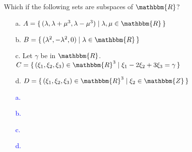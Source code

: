 \documentclass[a4paper,12pt]{article}
\newcommand{\Br}[1]{\{\, #1 \,\}}
\newcommand{\R}{\mathbbm{R}}
\newcommand{\Z}{\mathbbm{Z}}
\begin{document}
\subsection{}
Which if the following sets are subspaces of $\R$?
\begin{itemize}
 \item [a.] $A = \Br{(\lambda,\lambda+\mu^3,\lambda-\mu^3) \mid \lambda, \mu \in \R}$
 \item [b.] $B = \Br{(\lambda^2, -\lambda^2,0) \mid \lambda \in \R}$
 \item [c.] Let $\gamma$ be in $\R$. \\ $C = \Br{(\xi_1,\xi_2, \xi_3) \in \R^3 \mid \xi_1-2\xi_2+3\xi_3 = \gamma}$
 \item [d.] $D = \Br{(\xi_1,\xi_2, \xi_3) \in \R^3 \mid \xi_2 \in \Z}$
\end{itemize}
\textcolor{blue}{
\begin{itemize}
 \item [a.]
 \item [b.]
 \item [c.]
 \item [d.]
\end{itemize}
}
\end{document}
